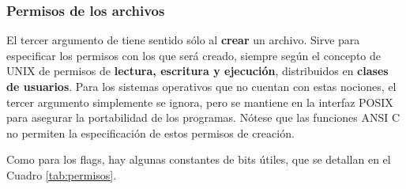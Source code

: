 \subsubsection{Permisos de los archivos}
El tercer argumento de  tiene sentido sólo al \textbf{crear} un archivo. Sirve
para especificar los permisos con los que será creado, siempre según el
concepto de UNIX de permisos de \textbf{lectura, escritura y ejecución}, distribuidos en
\textbf{clases de usuarios}. Para los sistemas operativos que no cuentan con estas
nociones, el tercer argumento simplemente se ignora, pero se mantiene en la
interfaz POSIX para asegurar la portabilidad de los programas. Nótese que las funciones ANSI C no permiten la especificación de estos permisos de creación.

Como para los flags, hay algunas constantes de bits útiles, que se detallan en el Cuadro \ref{tab:permisos}.

% 


